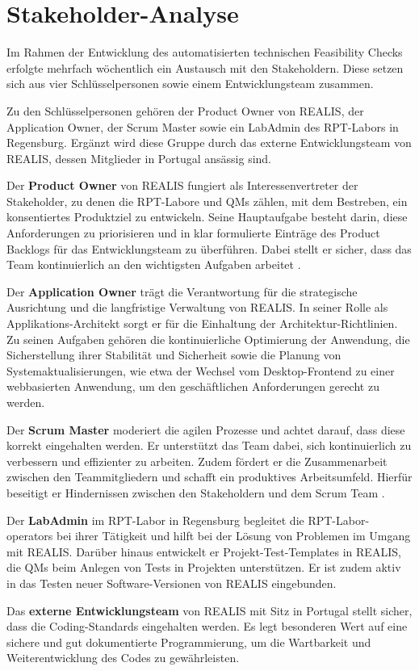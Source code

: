 \section{Stakeholder-Analyse}
Im Rahmen der Entwicklung des automatisierten technischen Feasibility Checks erfolgte mehrfach wöchentlich ein Austausch mit den Stakeholdern. Diese setzen sich aus vier Schlüsselpersonen sowie einem Entwicklungsteam zusammen.

Zu den Schlüsselpersonen gehören der Product Owner von \gls{REALIS}, der Application Owner, der Scrum Master sowie ein LabAdmin des \gls{RPT}-Labors in Regensburg. Ergänzt wird diese Gruppe durch das externe Entwicklungsteam von \gls{REALIS}, dessen Mitglieder in Portugal ansässig sind.

Der \textbf{Product Owner} von \gls{REALIS} fungiert als Interessenvertreter der Stakeholder, zu denen die \gls{RPT}-Labore und \glspl{QM} zählen, mit dem Bestreben, ein konsentiertes Produktziel zu entwickeln. Seine Hauptaufgabe besteht darin, diese Anforderungen zu priorisieren und in klar formulierte Einträge des Product Backlogs für das Entwicklungsteam zu überführen. Dabei stellt er sicher, dass das Team kontinuierlich an den wichtigsten Aufgaben arbeitet \cite{scrumguide2020}.

Der \textbf{Application Owner} trägt die Verantwortung für die strategische Ausrichtung und die langfristige Verwaltung von \gls{REALIS}. In seiner Rolle als Applikations-Architekt sorgt er für die Einhaltung der Architektur-Richtlinien. Zu seinen Aufgaben gehören die kontinuierliche Optimierung der Anwendung, die Sicherstellung ihrer Stabilität und Sicherheit sowie die Planung von Systemaktualisierungen, wie etwa der Wechsel vom Desktop-Frontend zu einer webbasierten Anwendung, um den geschäftlichen Anforderungen gerecht zu werden.

Der \textbf{Scrum Master} moderiert die agilen Prozesse und achtet darauf, dass diese korrekt eingehalten werden. Er unterstützt das Team dabei, sich kontinuierlich zu verbessern und effizienter zu arbeiten. Zudem fördert er die Zusammenarbeit zwischen den Teammitgliedern und schafft ein produktives Arbeitsumfeld. Hierfür beseitigt er Hindernissen zwischen den Stakeholdern und dem Scrum Team \cite{scrumguide2020}.

Der \textbf{LabAdmin} im \gls{RPT}-Labor in Regensburg begleitet die \gls{RPT}-Labor-\glspl{operator} bei ihrer Tätigkeit und hilft bei der Lösung von Problemen im Umgang mit \gls{REALIS}. Darüber hinaus entwickelt er Projekt-Test-Templates in \gls{REALIS}, die \glspl{QM} beim Anlegen von Tests in Projekten unterstützen. Er ist zudem aktiv in das Testen neuer Software-Versionen von \gls{REALIS} eingebunden.


Das \textbf{externe Entwicklungsteam} von \gls{REALIS} mit Sitz in Portugal stellt sicher, dass die Coding-Standards eingehalten werden. Es legt besonderen Wert auf eine sichere und gut dokumentierte Programmierung, um die Wartbarkeit und Weiterentwicklung des Codes zu gewährleisten.